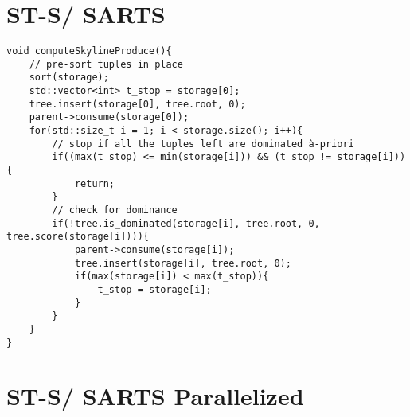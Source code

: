 \section{ST-S/ SARTS}
\begin{verbatim}
void computeSkylineProduce(){
	// pre-sort tuples in place
	sort(storage);
	std::vector<int> t_stop = storage[0];
	tree.insert(storage[0], tree.root, 0);
	parent->consume(storage[0]);
	for(std::size_t i = 1; i < storage.size(); i++){
		// stop if all the tuples left are dominated à-priori
		if((max(t_stop) <= min(storage[i])) && (t_stop != storage[i])){
			return;
		}
		// check for dominance
		if(!tree.is_dominated(storage[i], tree.root, 0, tree.score(storage[i]))){
			parent->consume(storage[i]);
			tree.insert(storage[i], tree.root, 0);
			if(max(storage[i]) < max(t_stop)){
				t_stop = storage[i];
			}
		}
	}
}
\end{verbatim}

\section{ST-S/ SARTS Parallelized}


